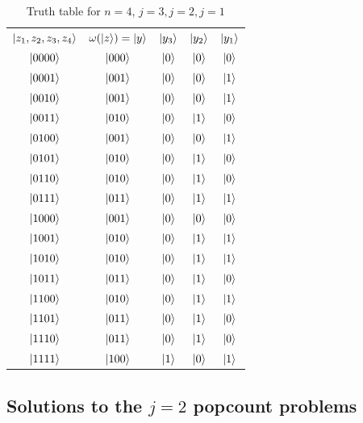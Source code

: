 \documentclass[12pt,a4paper]{article}
\begin{document}
\begin{table}[t]
    \centering
    \begin{tabular}{c|c|c|c|c}
        $\ket{z_1,z_2,z_3,z_4}$ & $\omega(\ket{z}) = \ket{y}$ & $\ket{y_3}$ & $\ket{y_2}$ & $\ket{y_1}$\\
        $\ket{0000}$& $\ket{000}$ & $\ket{0}$ & $\ket{0}$ & $\ket{0}$\\
        $\ket{0001}$& $\ket{001}$ & $\ket{0}$ & $\ket{0}$ & $\ket{1}$\\
        $\ket{0010}$& $\ket{001}$ & $\ket{0}$ & $\ket{0}$ & $\ket{1}$\\
        $\ket{0011}$& $\ket{010}$ & $\ket{0}$ & $\ket{1}$ & $\ket{0}$\\
        $\ket{0100}$& $\ket{001}$ & $\ket{0}$ & $\ket{0}$ & $\ket{1}$\\
        $\ket{0101}$& $\ket{010}$ & $\ket{0}$ & $\ket{1}$ & $\ket{0}$\\
        $\ket{0110}$& $\ket{010}$ & $\ket{0}$ & $\ket{1}$ & $\ket{0}$\\
        $\ket{0111}$& $\ket{011}$ & $\ket{0}$ & $\ket{1}$ & $\ket{1}$\\
        $\ket{1000}$& $\ket{001}$ & $\ket{0}$ & $\ket{0}$ & $\ket{0}$\\
        $\ket{1001}$& $\ket{010}$ & $\ket{0}$ & $\ket{1}$ & $\ket{1}$\\
        $\ket{1010}$& $\ket{010}$ & $\ket{0}$ & $\ket{1}$ & $\ket{1}$\\
        $\ket{1011}$& $\ket{011}$ & $\ket{0}$ & $\ket{1}$ & $\ket{0}$\\
        $\ket{1100}$& $\ket{010}$ & $\ket{0}$ & $\ket{1}$ & $\ket{1}$\\
        $\ket{1101}$& $\ket{011}$ & $\ket{0}$ & $\ket{1}$ & $\ket{0}$\\
        $\ket{1110}$& $\ket{011}$ & $\ket{0}$ & $\ket{1}$ & $\ket{0}$\\
        $\ket{1111}$& $\ket{100}$ & $\ket{1}$ & $\ket{0}$ & $\ket{1}$\\
        
    \end{tabular}
    \caption{Truth table for \(n=4\), \(j=3, j=2, j=1\)}
    \label{tab:ttn4j2}
\end{table}


\subsection{Solutions to the \(j=2\) popcount problems}
\end{document}
